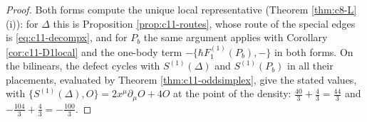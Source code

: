 \begin{proof}
Both forms compute the unique local representative (Theorem \ref{thm:c8-L} (i)): for $\Delta$ this is Proposition \ref{prop:c11-routes}, whose route of the special edges is \eqref{eq:c11-decompx}, and for $P_b$ the same argument applies with Corollary \ref{cor:c11-D1local} and the one-body term $-\{\hbar F_1^{(1)}(P_b),-\}$ in both forms. On the bilinears, the defect cycles with $S^{(1)}(\Delta)$ and $S^{(1)}(P_b)$ in all their placements, evaluated by Theorem \ref{thm:c11-oddsimplex}, give the stated values, with $\{S^{(1)}(\Delta),O\}=2x^\mu\partial_\mu O+4O$ at the point of the density: $\tfrac{40}3+\tfrac43=\tfrac{44}3$ and $-\tfrac{104}3+\tfrac43=-\tfrac{100}3$.
\end{proof}

